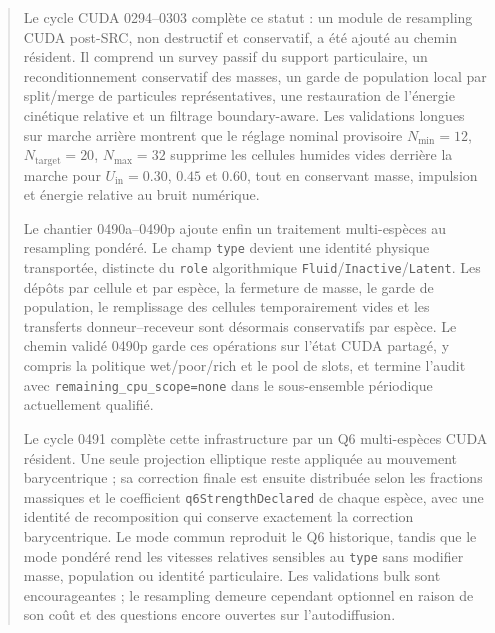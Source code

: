 \documentclass[11pt,a4paper]{article}
\begin{document}
\begin{abstract}
Le cycle CUDA 0294--0303 complète ce statut : un module de resampling CUDA post-SRC, non destructif et conservatif, a été ajouté au chemin résident. Il comprend un survey passif du support particulaire, un reconditionnement conservatif des masses, un garde de population local par split/merge de particules représentatives, une restauration de l'énergie cinétique relative et un filtrage boundary-aware. Les validations longues sur marche arrière montrent que le réglage nominal provisoire $N_{\min}=12$, $N_{\mathrm{target}}=20$, $N_{\mathrm{max}}=32$ supprime les cellules humides vides derrière la marche pour $U_{\mathrm{in}}=0.30$, $0.45$ et $0.60$, tout en conservant masse, impulsion et énergie relative au bruit numérique.



Le chantier 0490a--0490p ajoute enfin un traitement multi-espèces au resampling pondéré. Le champ \texttt{type} devient une identité physique transportée, distincte du \texttt{role} algorithmique \texttt{Fluid}/\texttt{Inactive}/\texttt{Latent}. Les dépôts par cellule et par espèce, la fermeture de masse, le garde de population, le remplissage des cellules temporairement vides et les transferts donneur--receveur sont désormais conservatifs par espèce. Le chemin validé 0490p garde ces opérations sur l'état CUDA partagé, y compris la politique wet/poor/rich et le pool de slots, et termine l'audit avec \texttt{remaining\_cpu\_scope=none} dans le sous-ensemble périodique actuellement qualifié.

Le cycle 0491 complète cette infrastructure par un Q6 multi-espèces CUDA résident. Une seule projection elliptique reste appliquée au mouvement barycentrique ; sa correction finale est ensuite distribuée selon les fractions massiques et le coefficient \texttt{q6StrengthDeclared} de chaque espèce, avec une identité de recomposition qui conserve exactement la correction barycentrique. Le mode commun reproduit le Q6 historique, tandis que le mode pondéré rend les vitesses relatives sensibles au \texttt{type} sans modifier masse, population ou identité particulaire. Les validations bulk sont encourageantes ; le resampling demeure cependant optionnel en raison de son coût et des questions encore ouvertes sur l'autodiffusion.




\end{abstract}
\end{document}
